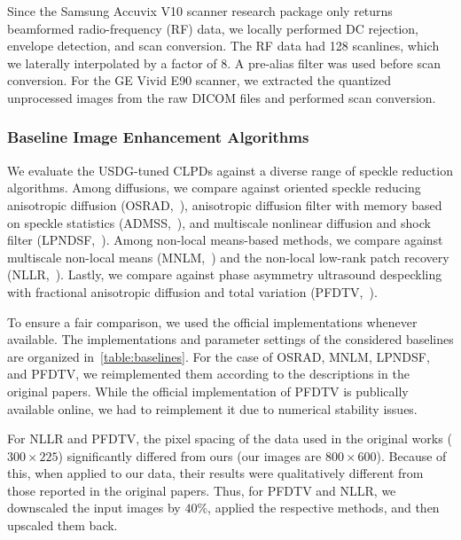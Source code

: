 Since the Samsung Accuvix V10 scanner research package only returns beamformed radio-frequency (RF) data, we locally performed DC rejection, envelope detection, and scan conversion.
The RF data had 128 scanlines, which we laterally interpolated by a factor of 8.
A pre-alias filter was used before scan conversion.
For the GE Vivid E90 scanner, we extracted the quantized unprocessed images from the raw DICOM files and performed scan conversion.


\subsubsection{Baseline Image Enhancement Algorithms}\label{section:baseline}
We evaluate the USDG-tuned CLPDs against a diverse range of speckle reduction algorithms.
Among diffusions, we compare against oriented speckle reducing anisotropic diffusion (OSRAD,~\cite{krissian_oriented_2007}), anisotropic diffusion filter with memory based on speckle statistics (ADMSS,~\cite{ramos-llorden_anisotropic_2015}), and multiscale nonlinear diffusion and shock filter (LPNDSF,~\cite{zhang_multiscale_2006}).
Among non-local means-based methods, we compare against multiscale non-local means (MNLM,~\cite{breivik_realtime_2017}) and the non-local low-rank patch recovery (NLLR,~\cite{zhu_nonlocal_2017}).
Lastly, we compare against phase asymmetry ultrasound despeckling with fractional anisotropic diffusion and total variation (PFDTV,~\cite{mei_phase_2020}).

To ensure a fair comparison, we used the official implementations whenever available.
The implementations and parameter settings of the considered baselines are organized in~\cref{table:baselines}.
For the case of OSRAD, MNLM, LPNDSF, and PFDTV, we reimplemented them according to the descriptions in the original papers.
While the official implementation of PFDTV is publically available online, we had to reimplement it due to numerical stability issues.

For NLLR and PFDTV, the pixel spacing of the data used in the original works (\(300 \times 225\)) significantly differed from ours (our images are \(800 \times 600\)).
Because of this, when applied to our data, their results were qualitatively different from those reported in the original papers.
Thus, for PFDTV and NLLR, we downscaled the input images by \(40\%\), applied the respective methods, and then upscaled them back.


